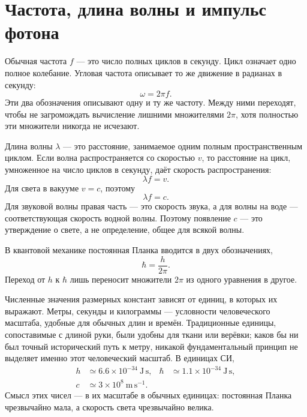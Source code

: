 \section{Частота, длина волны и импульс фотона}

Обычная частота \(f\) — это число полных циклов в секунду. Цикл означает одно полное колебание. Угловая частота описывает то же движение в радианах в секунду:
\begin{equation}
\omega=2\pi f.
\end{equation}
Эти два обозначения описывают одну и ту же частоту. Между ними переходят, чтобы не загромождать вычисление лишними множителями \(2\pi\), хотя полностью эти множители никогда не исчезают.

Длина волны \(\lambda\) — это расстояние, занимаемое одним полным пространственным циклом. Если волна распространяется со скоростью \(v\), то расстояние на цикл, умноженное на число циклов в секунду, даёт скорость распространения:
\begin{equation}
\lambda f=v.
\end{equation}
Для света в вакууме \(v=c\), поэтому
\begin{equation}
\lambda f=c.
\end{equation}
Для звуковой волны правая часть — это скорость звука, а для волны на воде — соответствующая скорость водной волны. Поэтому появление \(c\) — это утверждение о свете, а не определение, общее для всякой волны.

В квантовой механике постоянная Планка вводится в двух обозначениях,
\begin{equation}
\hbar=\frac{h}{2\pi}.
\end{equation}
Переход от \(h\) к \(\hbar\) лишь переносит множители \(2\pi\) из одного уравнения в другое.

Численные значения размерных констант зависят от единиц, в которых их выражают. Метры, секунды и килограммы — условности человеческого масштаба, удобные для обычных длин и времён. Традиционные единицы, сопоставимые с длиной руки, были удобны для ткани или верёвки; каков бы ни был точный исторический путь к метру, никакой фундаментальный принцип не выделяет именно этот человеческий масштаб. В единицах СИ,
\begin{equation}
\begin{aligned}
h &\simeq 6.6\times10^{-34}\ \mathrm{J\,s},
&\hbar &\simeq 1.1\times10^{-34}\ \mathrm{J\,s},\\
c &\simeq 3\times10^8\ \mathrm{m\,s^{-1}}.
\end{aligned}
\end{equation}
Смысл этих чисел — в их масштабе в обычных единицах: постоянная Планка чрезвычайно мала, а скорость света чрезвычайно велика.

